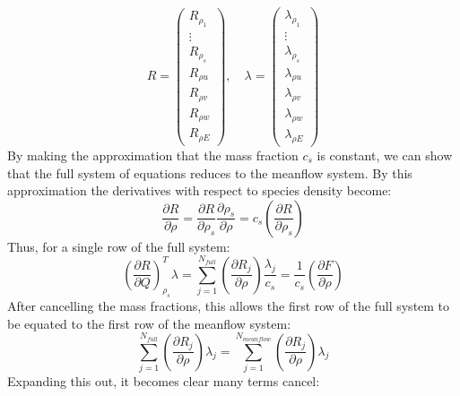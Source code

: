 \documentclass{article}   	%
\begin{document}
\begin{equation}
  R = \begin{pmatrix} 
        R_{\rho_1} \\ \vdots \\ R_{\rho_s} \\ R_{\rho u} \\
        R_{\rho v} \\ R_{\rho w} \\ R_{\rho E}
      \end{pmatrix}, \quad
      \lambda = \begin{pmatrix}
        \lambda_{\rho_1} \\ \vdots \\ \lambda_{\rho_s} \\
        \lambda_{\rho u} \\ \lambda_{\rho v} \\ \lambda_{\rho w} \\
        \lambda_{\rho E}
      \end{pmatrix}
  \label{full_sys}
\end{equation}
By making the approximation that the mass fraction $c_s$ is constant, we can show that the full system of equations reduces to the meanflow system.  By this approximation the derivatives with respect to species density become:
\begin{equation}
  \frac{\partial R}{\partial \rho} =
  \frac{\partial R}{\partial \rho_s} 
  \frac{\partial \rho_s}{\partial \rho} =
  c_s\left(\frac{\partial R}{\partial \rho_s}\right)
  \label{mass_frac_approx}
\end{equation}
Thus, for a single row of the full system:
\begin{equation}
  \left(\frac{\partial R}{\partial Q}\right)_{\rho_s}^T \lambda 
  = \sum_{j=1}^{N_{full}}{
    \left(\frac{\partial R_j}{\partial \rho}\right) \frac{\lambda_j}{c_s}}
    = \frac{1}{c_s}\left(\frac{\partial F}{\partial \rho}\right)
  \label{full_reduction}
\end{equation}
After cancelling the mass fractions, this allows the first row of the full system to be equated to the first row of the meanflow system:
\begin{equation}
  \sum_{j=1}^{N_{full}}{
    \left(\frac{\partial R_j}{\partial \rho}\right) \lambda_j}
  = \sum_{j=1}^{N_{meanflow}}{
    \left(\frac{\partial R_j}{\partial \rho}\right) \lambda_j}
  \label{eq_mean_full}
\end{equation}
Expanding this out, it becomes clear many terms cancel:
\end{document}
